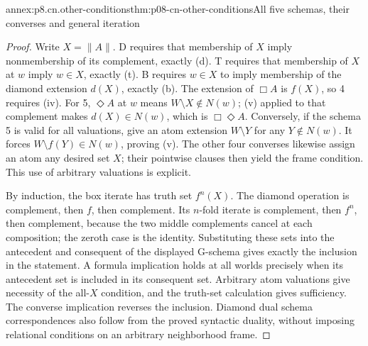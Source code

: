 \begin{annexitem}{annex:p8.cn.other-conditions}{thm:p08-cn-other-conditions}{All five schemas, their converses and general iteration}
\begin{proof}
Write \(X=\|A\|\). D requires that membership of \(X\)
imply nonmembership of its complement, exactly (d). T requires
that membership of \(X\) at \(w\) imply \(w\in X\),
exactly (t). B requires \(w\in X\) to imply membership
of the diamond extension \(d(X)\), exactly (b). The extension
of \(\Box A\) is \(f(X)\), so 4 requires (iv).
For 5, \(\Diamond A\) at \(w\) means
\(W\setminus X\notin N(w)\); (v) applied to that
complement makes \(d(X)\in N(w)\), which is
\(\Box\Diamond A\). Conversely, if the schema 5 is
valid for all valuations, give an atom extension
\(W\setminus Y\) for any \(Y\notin N(w)\).
It forces \(W\setminus f(Y)\in N(w)\), proving (v).
The other four converses likewise assign an atom any desired
set \(X\); their pointwise clauses then yield the frame
condition. This use of arbitrary valuations is explicit.

By induction, the box iterate has truth set \(f^n(X)\).
The diamond operation is complement, then \(f\), then
complement. Its \(n\)-fold iterate is complement, then
\(f^n\), then complement, because the two middle complements
cancel at each composition; the zeroth case is the identity.
Substituting these sets into the antecedent and consequent of
the displayed G-schema gives exactly the inclusion in the
statement. A formula implication holds at all worlds precisely
when its antecedent set is included in its consequent set.
Arbitrary atom valuations give necessity of the all-\(X\)
condition, and the truth-set calculation gives sufficiency.
The converse implication reverses the inclusion. Diamond dual
schema correspondences also follow from the proved syntactic
duality, without imposing relational conditions on an arbitrary
neighborhood frame.
\end{proof}
\end{annexitem}


